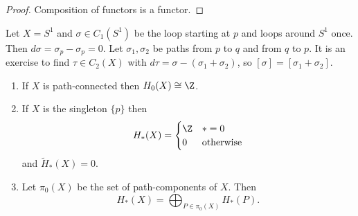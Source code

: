\documentclass[a4paper]{article}
\begin{document}
\begin{proof}
  Composition of functors is a functor.
\end{proof}

\begin{eg}
  Let \(X = S^1\) and \(\sigma \in C_1(S^1)\) be the loop starting at \(p\) and loops around \(S^1\) once. Then \(d \sigma = \sigma_p - \sigma_p = 0\). Let \(\sigma_1, \sigma_2\) be paths from \(p\) to \(q\) and from \(q\) to \(p\). It is an exercise to find \(\tau \in C_2(X)\) with \(d\tau = \sigma - (\sigma_1 + \sigma_2)\), so \([\sigma] = [\sigma_1 + \sigma_2]\).
  \begin{figure}[ht]
  \centering
  \begin{minipage}{0.5\textwidth}
    \centering
    \def\svgwidth{.8\columnwidth}
    
  \end{minipage}%
  \begin{minipage}{0.5\textwidth}
    \centering
    \def\svgwidth{.8\columnwidth}
    
  \end{minipage}
\end{figure}
\end{eg}

\begin{proposition}\leavevmode
  \begin{enumerate}
  \item If \(X\) is path-connected then \(H_0(X) \cong \Z\).
  \item If \(X\) is the singleton \(\{p\}\) then
    \[
      H_*(X) =
      \begin{cases}
        \Z & * = 0 \\
        0 & \text{otherwise}
      \end{cases}
    \]
    and \(\widetilde H_*(X) = 0\).
  \item Let \(\pi_0(X)\) be the set of path-components of \(X\). Then
    \[
      H_*(X) = \bigoplus_{P \in \pi_0(X)} H_*(P).
    \]
  \end{enumerate}
\end{proposition}
\end{document}
